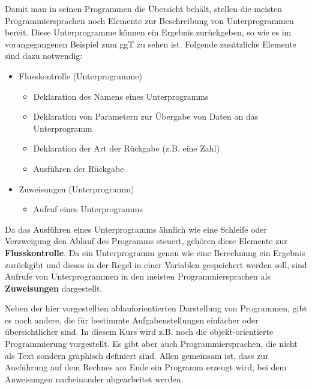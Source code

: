 Damit man in seinen Programmen die Übersicht behält, stellen die meisten Programmiersprachen noch Elemente zur Beschreibung von Unterprogrammen bereit. 
Diese Unterprogramme können ein Ergebnis zurückgeben, so wie es im vorangegangenen Beispiel zum ggT zu sehen ist. 
Folgende zusätzliche Elemente sind dazu notwendig:
\begin{itemize}
  \item Flusskontrolle (Unterprogramme)
  \begin{itemize}
	  \item Deklaration des Namens eines Unterprogramms
    \item Deklaration von Parametern zur Übergabe von Daten an das Unterprogramm  
    \item Deklaration der Art der Rückgabe (z.B. eine Zahl)
    \item Ausführen der Rückgabe  
	\end{itemize}
	\item Zuweisungen (Unterprogramm)
  \begin{itemize}	
    \item Aufruf eines Unterprogramms
	\end{itemize}
\end{itemize}
\vfill\null\columnbreak
Da das Ausführen eines Unterprogramms ähnlich wie eine Schleife oder Verzweigung den Ablauf des Programms steuert, gehören diese Elemente zur 
\textbf{Flusskontrolle}.
Da ein Unterprogramm genau wie eine Berechnung ein Ergebnis zurückgibt und dieses in der Regel in einer Variablen gespeichert werden soll, sind Aufrufe von Unterprogrammen in den meisten Programmiersprachen als \textbf{Zuweisungen} dargestellt. 

\begin{anotation}
Neben der hier vorgestellten ablauforientierten Darstellung von Programmen, gibt es noch andere, die für bestimmte Aufgabenstellungen einfacher oder 
übersichtlicher sind. In diesem Kurs wird z.B. noch die objekt-orientierte Programmierung vorgestellt. Es gibt aber auch Programmiersprachen, 
die nicht als Text sondern graphisch definiert sind. Allen gemeinsam ist, dass zur Ausführung auf dem Rechnes am Ende ein Programm erzeugt wird, 
bei dem Anweisungen nacheinander abgearbeitet werden.
\end{anotation}


